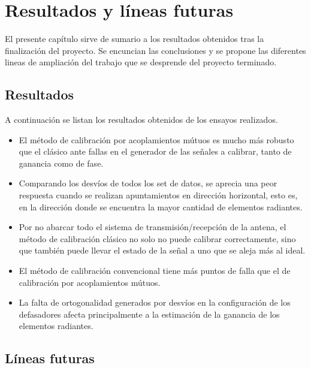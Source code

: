 \chapter{Resultados y líneas futuras}

El presente capítulo sirve de sumario a los resultados obtenidos tras la finalización del proyecto. Se encuncian las 
conclusiones y se propone las diferentes lineas de ampliación del trabajo que se desprende del proyecto terminado.

\section{Resultados}

A continuación se listan los resultados obtenidos de los ensayos realizados.
\begin{itemize}
	\item El método de calibración por acoplamientos mútuos es mucho más robusto que el clásico ante fallas en el generador 
		de las señales a calibrar, tanto de ganancia como de fase.
	\item Comparando los desvíos de todos los set de datos, se aprecia una peor respuesta cuando se realizan apuntamientos 
		en dirección horizontal, esto es, en la dirección donde se encuentra la mayor cantidad de elementos radiantes.
	\item Por no abarcar todo el sistema de transmisión/recepción de la antena, el método de calibración clásico no solo no 
		puede calibrar correctamente, sino que también puede llevar el estado de la señal a uno que se aleja más al ideal.
	\item El método de calibración convencional tiene más puntos de falla que el de calibración por acoplamientos mútuos.
	\item La falta de ortogonalidad generados por desvíos en la configuración de los defasadores afecta principalmente a la 
		estimación de la ganancia de los elementos radiantes.
\end{itemize}

\section{Líneas futuras}

